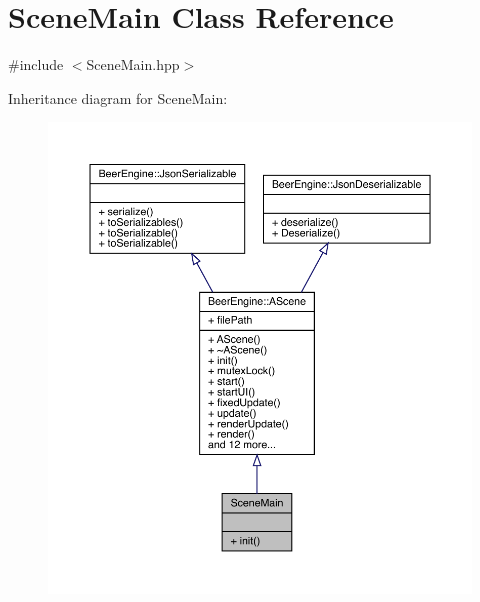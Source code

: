 \hypertarget{class_scene_main}{}\section{Scene\+Main Class Reference}
\label{class_scene_main}


{\ttfamily \#include $<$Scene\+Main.\+hpp$>$}



Inheritance diagram for Scene\+Main\+:
\nopagebreak
\begin{figure}[H]
\begin{center}
\leavevmode
\includegraphics[width=350pt]{class_scene_main__inherit__graph}
\end{center}
\end{figure}


